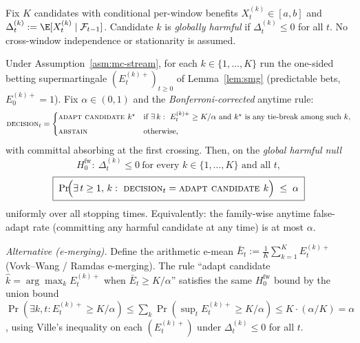 %

\begin{assumption}\label{asm:mc-stream}
Fix $K$ candidates with conditional per-window benefits
$X_t^{(k)}\in[a,b]$ and $\Delta_t^{(k)}:=\E[X_t^{(k)}\mid\mathcal F_{t-1}]$.
Candidate $k$ is \emph{globally harmful} if $\Delta_t^{(k)}\le0$ for all $t$.
No cross-window independence or stationarity is assumed.
\end{assumption}

\begin{theorem}
\label{thm:anytime-multicand}
Under Assumption~\ref{asm:mc-stream}, for each $k\in\{1,\dots,K\}$ run the one-sided betting
supermartingale $(E_t^{(k)+})_{t\ge0}$ of Lemma~\ref{lem:smg} (predictable bets, $E_0^{(k)+}=1$).
Fix $\alpha\in(0,1)$ and the \emph{Bonferroni-corrected} anytime rule:
\[
  \textsc{decision}_t=
  \begin{cases}
    \textsc{adapt candidate }k^\star &
      \text{if }\exists\,k:\ E_t^{(k)+}\ge K/\alpha
      \text{ and }k^\star\text{ is any tie-break among such }k,\\[4pt]
    \textsc{abstain} & \text{otherwise,}
  \end{cases}
\]
with committal absorbing at the first crossing.  Then, on the \emph{global harmful null}
\[
  H_0^{\mathrm{fw}}:\ \Delta_t^{(k)}\le0\ \text{for every }k\in\{1,\dots,K\}\text{ and all }t,
\]
\[
  \boxed{\;
  \Pr\!\Bigl(\exists\,t\ge1,\,k:\ \textsc{decision}_t=\textsc{adapt candidate }k\Bigr)
  \;\le\;\alpha\;}
\]
uniformly over all stopping times.  Equivalently: the family-wise anytime false-adapt rate
(committing any harmful candidate at any time) is at most $\alpha$.

\emph{Alternative (e-merging).} Define the arithmetic e-mean
$\bar E_t:=\tfrac1K\sum_{k=1}^K E_t^{(k)+}$ (Vovk--Wang / Ramdas e-merging).  The rule
``adapt candidate $\hat k=\arg\max_k E_t^{(k)+}$ when $\bar E_t\ge K/\alpha$'' satisfies the
same $H_0^{\mathrm{fw}}$ bound by the union bound
$\Pr(\exists k,t:E_t^{(k)+}\ge K/\alpha)\le\sum_k\Pr(\sup_t E_t^{(k)+}\ge K/\alpha)
\le K\cdot(\alpha/K)=\alpha$, using Ville's inequality on each $(E_t^{(k)+})$ under
$\Delta_t^{(k)}\le0$ for all $t$.
\end{theorem}

